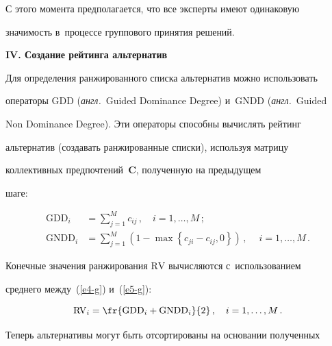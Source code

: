   


  С этого момента предполагается, что все эксперты имеют одинаковую 


значимость в~процессе группового принятия решений. 


  


  \textbf{IV. Создание рейтинга альтернатив}


  


  Для определения ранжированного списка альтернатив можно использовать 


операторы GDD (\textit{англ.}\ Guided Dominance Degree) и~GNDD (\textit{англ.}\ Guided 


Non Dominance Degree). Эти операторы способны вычислять рейтинг 


альтернатив (создавать ранжированные списки), используя матрицу 


коллективных предпочтений~$\mathbf{C}$, полученную на предыдущем 


шаге:


  \begin{align}


  \mathrm{GDD}_i&= \sum\limits^M_{j=1} c_{ij}\,,\quad i=1,\ldots , M\,;\label{e4-g}\\


\mathrm{GNDD}_i &= \sum\limits^M_{j=1} \left( 1-\max \left\{  c_{ji} -c_{ij}, 


0\right\}\right) \,,\ \quad i=1, \ldots , M\,.


  \label{e5-g}


  \end{align}


  


  Конечные значения ранжирования $\mathrm{RV}$ вычисляются с~использованием 


среднего между~(\ref{e4-g}) и~(\ref{e5-g}):


  \begin{equation*}


  \mathrm{RV}_i=\fr{\mathrm{GDD}_i+\mathrm{GNDD}_i}{2}\,,\quad i=1, \ldots , M\,.




  \end{equation*}


  


  Теперь альтернативы могут быть отсортированы на основании полученных 


